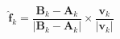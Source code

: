 \documentclass[border=2pt,varwidth]{standalone}
\begin{document}
\[
  \hat{\mathbf{f}}_k =
  \frac{\mathbf{B}_k - \mathbf{A}_k}
       {\left | \mathbf{B}_k - \mathbf{A}_k \right |}
  \times
  \frac{\mathbf{v}_k}{\left | \mathbf{v}_k \right |}
\]
\end{document}
